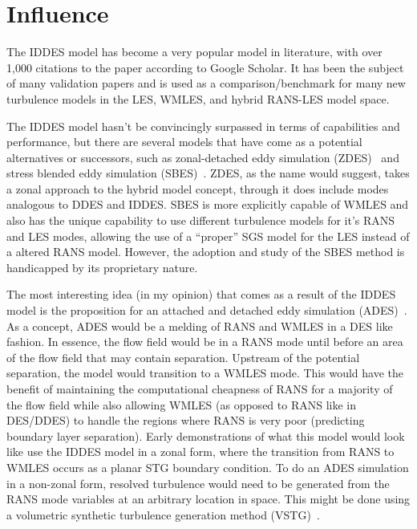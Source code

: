 \documentclass{ucb}
\begin{document}

\section{Influence}
The IDDES model has become a very popular model in literature, with over 1,000 citations to the paper according to Google Scholar. It has been the subject of many validation papers and is used as a comparison/benchmark for many new turbulence models in the LES, WMLES, and hybrid RANS-LES model space. 

The IDDES model hasn't be convincingly surpassed in terms of capabilities and performance, but there are several models that have come as a potential alternatives or successors, such as zonal-detached eddy simulation (ZDES)~\cite{deckRecentImprovementsZonal2012} and stress blended eddy simulation (SBES)~\cite{Menter2018}. ZDES, as the name would suggest, takes a zonal approach to the hybrid model concept, through it does include modes analogous to DDES and IDDES. SBES is more explicitly capable of WMLES and also has the unique capability to use different turbulence models for it's RANS and LES modes, allowing the use of a ``proper'' SGS model for the LES instead of a altered RANS model. However, the adoption and study of the SBES method is handicapped by its proprietary nature.

The most interesting idea (in my opinion) that comes as a result of the IDDES model is the proposition for an attached and detached eddy simulation (ADES)~\cite{spalartAttachedDetatchedEddy2018}. As a concept, ADES would be a melding of RANS and WMLES in a DES like fashion. In essence, the flow field would be in a RANS mode until before an area of the flow field that may contain separation. Upstream of the potential separation, the model would transition to a WMLES mode. This would have the benefit of maintaining the computational cheapness of RANS for a majority of the flow field while also allowing WMLES (as opposed to RANS like in DES/DDES) to handle the regions where RANS is very poor (predicting boundary layer separation). Early demonstrations of what this model would look like use the IDDES model in a zonal form, where the transition from RANS to WMLES occurs as a planar STG boundary condition. 
To do an ADES simulation in a non-zonal form, resolved turbulence would need to be generated from the RANS mode variables at an arbitrary location in space. This might be done using a volumetric synthetic turbulence generation method (VSTG)~\cite{shurImprovedEmbeddedApproaches2018}.
\end{document}
